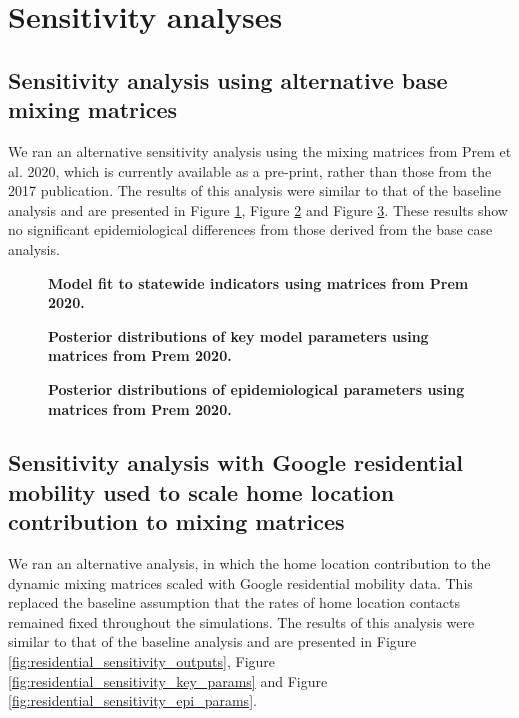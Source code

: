 
\section{Sensitivity analyses}
\subsection{Sensitivity analysis using alternative base mixing matrices}
We ran an alternative sensitivity analysis using the mixing matrices from Prem et al. 2020,\cite{RN81} which is currently available as a pre-print, rather than those from the 2017 publication. The results of this analysis were similar to that of the baseline analysis and are presented in Figure \ref{fig:prem_sensitivity_outputs}, Figure \ref{fig:prem_sensitivity_key_params} and Figure \ref{fig:prem_sensitivity_epi_params}. These results show no significant epidemiological differences from those derived from the base case analysis.

\begin{figure}[ht]
    \caption{\textbf{Model fit to statewide indicators using matrices from Prem 2020.}}
    \label{fig:prem_sensitivity_outputs}
\end{figure}

\begin{figure}[ht]
    \caption{\textbf{Posterior distributions of key model parameters using matrices from Prem 2020.}}
    \label{fig:prem_sensitivity_key_params}
\end{figure}

\begin{figure}[ht]
    \caption{\textbf{Posterior distributions of epidemiological parameters using matrices from Prem 2020.}}
    \label{fig:prem_sensitivity_epi_params}
\end{figure}

\subsection{Sensitivity analysis with Google residential mobility used to scale home location contribution to mixing matrices}
We ran an alternative analysis, in which the home location contribution to the dynamic mixing matrices scaled with Google residential mobility data. This replaced the baseline assumption that the rates of home location contacts remained fixed throughout the simulations. The results of this analysis were similar to that of the baseline analysis and are presented in Figure \ref{fig:residential_sensitivity_outputs}, Figure \ref{fig:residential_sensitivity_key_params} and Figure \ref{fig:residential_sensitivity_epi_params}.


